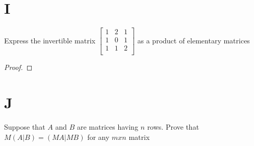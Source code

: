 \documentclass[11pt]{scrartcl}
\begin{document}
\section{I} 
Express the invertible matrix
$
\begin{bmatrix}
1 & 2 & 1\\
1 & 0 & 1 \\ 
1 & 1 & 2 \\ 
\end{bmatrix}
$
as a product of elementary matrices
\begin{proof}

\end{proof}

\section{J}
Suppose that $A$ and $B$ are matrices having $n$ rows. Prove that $M(A|B) = (MA|MB)$ for any $mxn$ matrix
\end{document}
